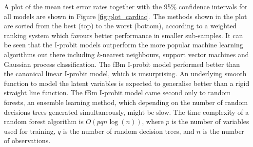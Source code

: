 \documentclass[a4paper,showframe,11pt]{report}\usepackage[]{graphicx}\usepackage[]{color}
\begin{document}
A plot of the mean test error rates together with the 95\% confidence intervals for all models are shown in Figure \ref{fig:plot_cardiac}. The methods shown in the plot are sorted from the best (top) to the worst (bottom), according to a weighted ranking system which favours better performance in smaller sub-samples. It can be seen that the I-probit models outperform the more popular machine learning algorithms out there including $k$-nearest neighbours, support vector machines and Gaussian process classification. The fBm I-probit model performed better than the canonical linear I-probit model, which is unsurprising. An underlying smooth function to model the latent variables is expected to generalise better than a rigid straight line function. The fBm I-probit model came second only to random forests, an ensemble learning method, which depending on the number of random decisions trees generated simultaneously, might be slow. The time complexity of a random forest algorithm is $O(pqn\log(n))$, where $p$ is the number of variables used for training, $q$ is the number of random decision trees, and $n$ is the number of observations.
\end{document}

